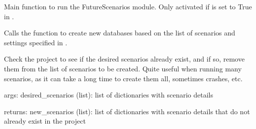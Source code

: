 \documentclass[letterpaper,10pt,english]{sphinxmanual}
\begin{document}

\begin{fulllineitems}
\label{\detokenize{WasteAndMaterialFootprint:WasteAndMaterialFootprint.FutureScenarios.MakeFutureScenarios}}
\pysigstartsignatures
{}
\pysigstopsignatures
\sphinxAtStartPar
Main function to run the FutureScenarios module.
Only activated if  is set to True in .

\sphinxAtStartPar
Calls the  function to create new databases based on the list of scenarios and settings specified in .

\end{fulllineitems}


\begin{fulllineitems}
\label{\detokenize{WasteAndMaterialFootprint:WasteAndMaterialFootprint.FutureScenarios.check_existing}}
\pysigstartsignatures
{}
\pysigstopsignatures
\sphinxAtStartPar
Check the project to see if the desired scenarios already exist, and if so, remove them from the list of scenarios to be created.
Quite useful when running many scenarios, as it can take a long time to create them all, sometimes crashes, etc.

\sphinxAtStartPar
args: desired\_scenarios (list): list of dictionaries with scenario details

\sphinxAtStartPar
returns: new\_scenarios (list): list of dictionaries with scenario details that do not already exist in the project

\end{fulllineitems}

\end{document}
